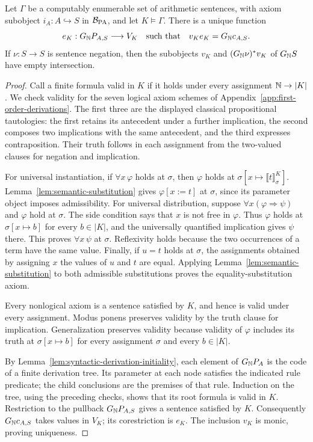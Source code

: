 \begin{proposition}
\label{prop:standard-code-soundness}
Let $\Gamma$ be a computably enumerable set of arithmetic sentences,
with axiom subobject $i_A:A\hookrightarrow S$ in
$\mathcal B_{\mathrm{PA}}$, and let $K\models\Gamma$.
There is a unique function
\[
 e_K:G_{\mathbb N}P_{A,S}\longrightarrow V_K
 \quad\text{such that}\quad
 v_Ke_K=G_{\mathbb N}c_{A,S}.
\]
If $\nu:S\to S$ is sentence negation, then the subobjects
$v_K$ and $(G_{\mathbb N}\nu)^*v_K$ of $G_{\mathbb N}S$ have empty
intersection.
\end{proposition}
\begin{proof}
Call a finite formula valid in $K$ if it holds under every
assignment $\mathbb N\to|K|$. We check validity for the seven logical
axiom schemes of Appendix~\ref{app:first-order-derivations}.
The first three are the displayed classical propositional
tautologies: the first retains its antecedent under a further
implication, the second composes two implications with the same
antecedent, and the third expresses contraposition. Their truth
follows in each assignment from the two-valued clauses for
negation and implication.

For universal instantiation, if $\forall x\,\varphi$ holds at
$\sigma$, then $\varphi$ holds at
$\sigma[x\mapsto\llbracket t\rrbracket^K_\sigma]$.
Lemma~\ref{lem:semantic-substitution} gives
$\varphi[x:=t]$ at $\sigma$, since its parameter object imposes
admissibility. For universal distribution, suppose
$\forall x(\varphi\Rightarrow\psi)$ and $\varphi$ hold at
$\sigma$. The side condition says that $x$ is not free in
$\varphi$. Thus $\varphi$ holds at $\sigma[x\mapsto b]$ for
every $b\in|K|$, and the universally quantified implication gives
$\psi$ there. This proves $\forall x\,\psi$ at $\sigma$.
Reflexivity holds because the two occurrences of a term have the
same value. Finally, if $u=t$ holds at $\sigma$, the assignments
obtained by assigning $x$ the values of $u$ and $t$ are equal.
Applying Lemma~\ref{lem:semantic-substitution} to both admissible
substitutions proves the equality-substitution axiom.

Every nonlogical axiom is a sentence satisfied by $K$, and hence
is valid under every assignment. Modus ponens preserves validity
by the truth clause for implication. Generalization preserves
validity because validity of $\varphi$ includes its truth at
$\sigma[x\mapsto b]$ for every assignment $\sigma$ and every
$b\in|K|$.

By Lemma~\ref{lem:syntactic-derivation-initiality}, each element
of $G_{\mathbb N}P_A$ is the code of a finite derivation tree. Its
parameter at each node satisfies the indicated rule predicate;
the child conclusions are the premises of that rule. Induction
on the tree, using the preceding checks, shows that its root
formula is valid in $K$. Restriction to the pullback
$G_{\mathbb N}P_{A,S}$ gives a sentence satisfied by $K$.
Consequently $G_{\mathbb N}c_{A,S}$ takes values in $V_K$; its
corestriction is $e_K$. The inclusion $v_K$ is monic, proving
uniqueness.


\end{proof}
